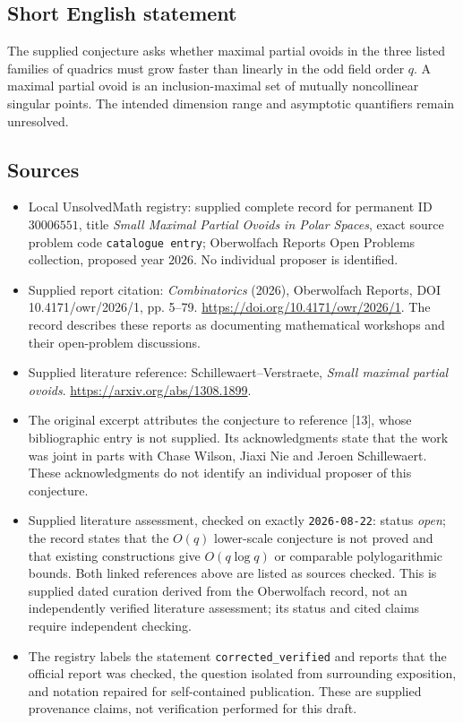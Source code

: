 \documentclass[11pt]{article}
\begin{document}
\subsection{Short English statement}
The supplied conjecture asks whether maximal partial ovoids in the three listed families of quadrics must grow faster than linearly in the odd field order \(q\). A maximal partial ovoid is an inclusion-maximal set of mutually noncollinear singular points. The intended dimension range and asymptotic quantifiers remain unresolved.
\subsection{Sources}
\begin{itemize}
\item Local UnsolvedMath registry: supplied complete record for permanent ID \(30006551\), title \emph{Small Maximal Partial Ovoids in Polar Spaces}, exact source problem code \texttt{catalogue entry}; Oberwolfach Reports Open Problems collection, proposed year \(2026\). No individual proposer is identified.
\item Supplied report citation: \emph{Combinatorics} (2026), Oberwolfach Reports, DOI 10.4171/owr/2026/1, pp. 5--79. \url{https://doi.org/10.4171/owr/2026/1}. The record describes these reports as documenting mathematical workshops and their open-problem discussions.
\item Supplied literature reference: Schillewaert--Verstraete, \emph{Small maximal partial ovoids}. \url{https://arxiv.org/abs/1308.1899}.
\item The original excerpt attributes the conjecture to reference [13], whose bibliographic entry is not supplied. Its acknowledgments state that the work was joint in parts with Chase Wilson, Jiaxi Nie and Jeroen Schillewaert. These acknowledgments do not identify an individual proposer of this conjecture.
\item Supplied literature assessment, checked on exactly \texttt{2026-08-22}: status \emph{open}; the record states that the \(O(q)\) lower-scale conjecture is not proved and that existing constructions give \(O(q\log q)\) or comparable polylogarithmic bounds. Both linked references above are listed as sources checked. This is supplied dated curation derived from the Oberwolfach record, not an independently verified literature assessment; its status and cited claims require independent checking.
\item The registry labels the statement \texttt{corrected\_verified} and reports that the official report was checked, the question isolated from surrounding exposition, and notation repaired for self-contained publication. These are supplied provenance claims, not verification performed for this draft.
\end{itemize}
\end{document}
